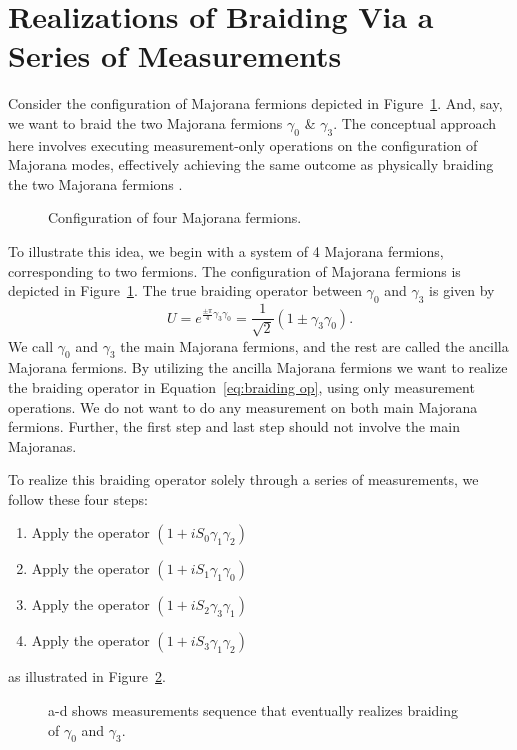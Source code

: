 \documentclass{article}
\begin{document}
\section{Realizations of Braiding Via a Series of Measurements} %
\label{sec:Realizations of Braiding Via a Series of Measurements}
Consider the configuration of Majorana fermions depicted in Figure~\ref{fig:4 mf conf}. And, say, we want to braid the two Majorana fermions $ \gamma_0 $ \& $ \gamma_3 $. The conceptual approach here involves executing measurement-only operations on the configuration of Majorana modes, effectively achieving the same outcome as physically braiding the two Majorana fermions \cite{Leijnse_2012}.
\begin{figure}
	\begin{center}
		
	\end{center}
	\caption{Configuration of four Majorana fermions.}
	\label{fig:4 mf conf}
\end{figure}
To illustrate this idea, we begin with a system of 4 Majorana fermions, corresponding to two fermions. The configuration of Majorana fermions is depicted in Figure~\ref{fig:4 mf conf}. The true braiding operator between $\gamma_0$ and $\gamma_3$ is given by
\begin{equation}
	U = e^{\frac{\pm \pi}{4} \gamma_3 \gamma_0} = \frac{1}{\sqrt{2}} (1 \pm \gamma_3 \gamma_0).
	\label{eq:braiding op}
\end{equation}
We call $ \gamma_0 $ and $ \gamma_3 $ the main Majorana fermions, and the rest are called the ancilla Majorana fermions. By utilizing the ancilla Majorana fermions we want to realize the braiding operator in Equation~\ref{eq:braiding op}, using only measurement operations. We do not want to do any measurement on both main Majorana fermions. Further, the first step and last step should not involve the main Majoranas.

To realize this braiding operator solely through a series of measurements, we follow these four steps:
\begin{enumerate}
	\item Apply the operator $ (1 + iS_0 \gamma_1 \gamma_2) $
	\item Apply the operator $ (1 + iS_1 \gamma_1 \gamma_0) $
	\item Apply the operator $ (1 + iS_2 \gamma_3 \gamma_1) $
	\item Apply the operator $ (1 + iS_3 \gamma_1 \gamma_2) $
\end{enumerate}
as illustrated in Figure~\ref{fig:meas 4 mfs}.
\begin{figure}
	\begin{center}
		
	\end{center}
	\caption{a-d shows measurements sequence that eventually realizes braiding of $ \gamma_0 $ and $ \gamma_3 $.}
	\label{fig:meas 4 mfs}
\end{figure}
\end{document}
